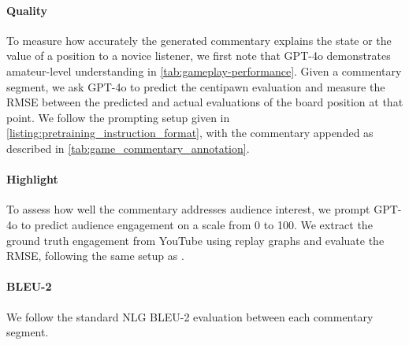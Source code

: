 \paragraph{Quality}
To measure how accurately the generated commentary explains the state or the value of a position to a novice listener, we first note that GPT-4o demonstrates amateur-level understanding in \cref{tab:gameplay-performance}. Given a commentary segment, we ask GPT-4o to predict the centipawn evaluation and measure the RMSE between the predicted and actual evaluations of the board position at that point. We follow the prompting setup given in \cref{listing:pretraining_instruction_format}, with the commentary appended as described in \cref{tab:game_commentary_annotation}.

\paragraph{Highlight}
To assess how well the commentary addresses audience interest, we prompt GPT-4o to predict audience engagement on a scale from 0 to 100. We extract the ground truth engagement from YouTube using replay graphs and evaluate the RMSE, following the same setup as \citet{singh2024teaching}.

\paragraph{BLEU-2}
We follow the standard NLG BLEU-2 evaluation between each commentary segment.

